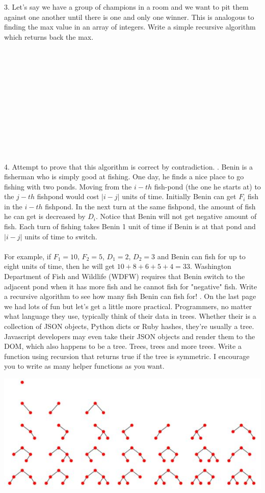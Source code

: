 \documentclass[12pt]{article}
\begin{document}
3. Let's say we have a group of champions in a room and we want to pit them against one another until there is one and only one winner. This is analogous to finding the max value in an array of integers. Write a simple recursive algorithm which returns back the max.\\\\\\\\\\\\\\\\\\\\\\\\\\
4. Attempt to prove that this algorithm is correct by contradiction. 
. Benin is a fisherman who is simply good at fishing. One day, he finds a nice place to go fishing with two ponds. 
Moving from the $i-th$ fish-pond (the one he starts at) to the $j-th$ fishpond would cost $|i - j|$ units of time. 
Initially Benin can get $F_i$ fish in the $i-th$ fishpond. 
In the next turn at the same fishpond, the amount of fish he can get is decreased by $D_i$. 
Notice that Benin will not get negative amount of fish.
Each turn of fishing takes Benin 1 unit of time if Benin is at that pond and $|i - j|$ units of time to switch.
\\\\
For example, if $F_1 = 10$, $F_2 = 5$, $D_1 = 2$, $D_2 = 3$ and Benin can fish for up to eight units of time, then he will get $10 + 8 + 6 + 5 + 4 = 33$.
Washington Department of Fish and Wildlife (WDFW) requires that Benin switch to the adjacent pond when it has more fish and he cannot fish for "negative" fish.
Write a recursive algorithm to see how many fish Benin can fish for!
. On the last page we had lots of fun but let's get a little more practical. Programmers, no matter what language they use, typically think of their data in trees. Whether their is a collection of JSON objects, Python dicts or Ruby hashes, they're usually a tree. Javascript developers may even take their JSON objects and render them to the DOM, which also happens to be a tree. Trees, trees and more trees. Write a function using recursion that returns true if the tree is symmetric. I encourage you to write as many helper functions as you want.\\
\centerline{\includegraphics[scale = 0.5]{binarytree.jpg}}
\end{document}
